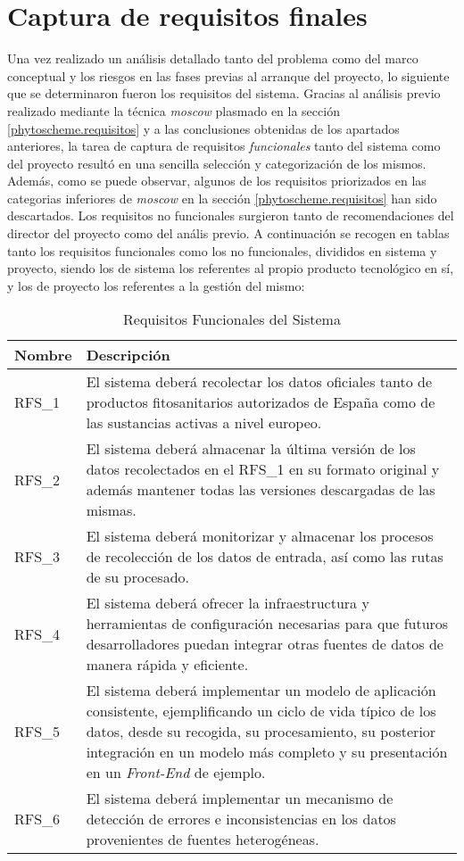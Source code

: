 \section{Captura de requisitos finales}  \label{analisis.requisitos}
Una vez realizado un análisis detallado tanto del problema como del marco conceptual y los riesgos en las fases previas al arranque del proyecto, lo  siguiente que se determinaron fueron los requisitos del sistema. Gracias al análisis previo realizado mediante la técnica \textit{\gls{moscow}} plasmado en la sección \ref{phytoscheme.requisitos} y a las conclusiones obtenidas de los apartados anteriores, la tarea de captura de requisitos \textit{funcionales} tanto del sistema como del proyecto resultó en una sencilla selección y categorización de los mismos. Además, como se puede observar, algunos de los requisitos priorizados en las categorias inferiores de \textit{\gls{moscow}} en la sección \ref{phytoscheme.requisitos} han sido descartados. Los requisitos no funcionales surgieron tanto de recomendaciones del director del proyecto como del anális previo. A continuación se recogen en tablas tanto los requisitos funcionales como los no funcionales, divididos en sistema y proyecto, siendo los de sistema los referentes al propio producto tecnológico en sí, y los de proyecto los referentes a la gestión del mismo: \par
\begin{table}[!h]
\centering
\bgroup
\def\arraystretch{1.3}
\begin{tabular}{l p{13cm}}
\toprule
\textbf{Nombre} & \textbf{Descripción} \\
 \midrule
RFS\_1 & 
El sistema deberá recolectar los datos oficiales tanto de productos fitosanitarios autorizados de España como de las sustancias activas a nivel europeo.
 \\
RFS\_2 & 
El sistema deberá almacenar la última versión de los datos recolectados en el RFS\_1 en su formato original y además mantener todas las versiones descargadas de las mismas. 
 \\
RFS\_3 & 
El sistema deberá monitorizar y almacenar los procesos de recolección de los datos de entrada, así como las rutas de su procesado. 
 \\
RFS\_4 & 
El sistema deberá ofrecer la infraestructura y herramientas de configuración necesarias para que futuros desarrolladores puedan integrar otras fuentes de datos de manera rápida y eficiente. 
 \\
RFS\_5 & 
El sistema deberá implementar un modelo de aplicación consistente, ejemplificando un ciclo de vida típico de los datos, desde su recogida, su procesamiento, su posterior integración en un modelo más completo y su presentación en un \textit{Front-End} de ejemplo.
 \\
RFS\_6 & 
El sistema deberá implementar un mecanismo de detección de errores e inconsistencias en los datos provenientes de fuentes heterogéneas.
 \\
\bottomrule
\end{tabular}
\egroup
\caption{Requisitos Funcionales del Sistema}
\label{tab:req_func_sist}
\end{table}


